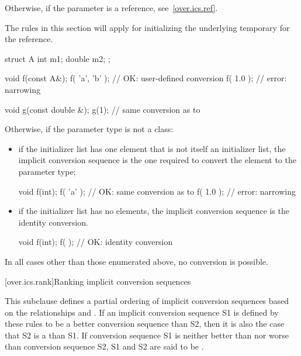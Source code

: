 \pnum
Otherwise, if the parameter is a reference, see~\ref{over.ics.ref}. \begin{note}
The rules in this section will apply for initializing the underlying temporary
for the reference. \end{note} \begin{example}
\begin{codeblock}
struct A {
  int m1;
  double m2;
};

void f(const A&);
f( {'a', 'b'} );        // OK:  user-defined conversion
f( {1.0} );             // error: narrowing

void g(const double &);
g({1});                 // same conversion as  to 
\end{codeblock}
\end{example}

\pnum
Otherwise, if the parameter type is not a class:

\begin{itemize}
\item if the initializer list has one element that is not itself an initializer list,
the implicit conversion sequence is the one required to convert the element to
the parameter type; \begin{example}
\begin{codeblock}
void f(int);
f( {'a'} );             // OK: same conversion as  to 
f( {1.0} );             // error: narrowing
\end{codeblock}
\end{example}

\item if the initializer list has no elements, the implicit conversion sequence
is the identity conversion. \begin{example}
\begin{codeblock}
void f(int);
f( { } );               // OK: identity conversion
\end{codeblock}
\end{example}
\end{itemize}

\pnum
In all cases other than those enumerated above, no conversion is possible.

[over.ics.rank]{Ranking implicit conversion sequences}

\pnum
This subclause defines a partial ordering of implicit conversion
sequences based on the relationships
and
.
If an implicit conversion sequence S1 is
defined by these rules to be a better conversion sequence than
S2, then it is also the case that S2 is a
than S1.
If conversion sequence S1 is neither better
than nor worse than conversion sequence S2, S1 and S2 are said to
be
.

